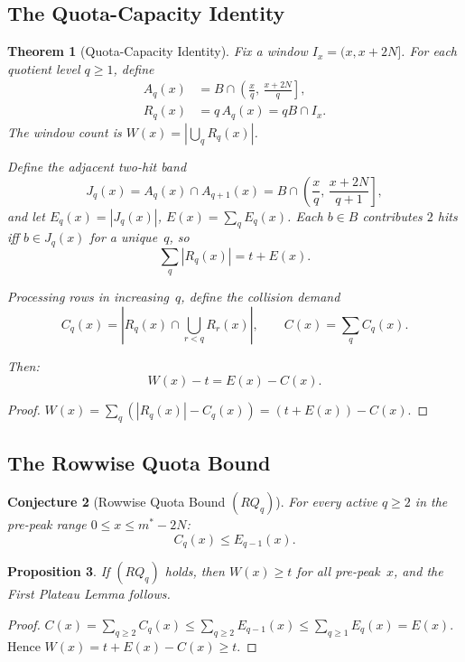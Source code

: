 \documentclass[11pt,a4paper]{article}
\newtheorem{theorem}{Theorem}[section]
\newtheorem{proposition}[theorem]{Proposition}
\newtheorem{conjecture}[theorem]{Conjecture}
\theoremstyle{definition}
\begin{document}
\subsection{The Quota-Capacity Identity}

\begin{theorem}[Quota-Capacity Identity]\label{thm:qci}
Fix a window $I_x = (x, x+2N]$. For each quotient level $q \geq 1$, 
define
\begin{align}
A_q(x) &= B \cap \left(\frac{x}{q},\, \frac{x+2N}{q}\right], \\
R_q(x) &= q\,A_q(x) = qB \cap I_x.
\end{align}
The window count is $W(x) = |\bigcup_q R_q(x)|$.

Define the adjacent two-hit band
\[
J_q(x) = A_q(x) \cap A_{q+1}(x) 
= B \cap \left(\frac{x}{q},\, \frac{x+2N}{q+1}\right],
\]
and let $E_q(x) = |J_q(x)|$, $E(x) = \sum_q E_q(x)$. Each $b \in B$ 
contributes $2$ hits iff $b \in J_q(x)$ for a unique~$q$, so
\[
\sum_q |R_q(x)| = t + E(x).
\]

Processing rows in increasing~$q$, define the collision demand
\[
C_q(x) = \left|R_q(x) \cap \bigcup_{r<q} R_r(x)\right|,
\qquad C(x) = \sum_q C_q(x).
\]

Then:
\[
\boxed{W(x) - t = E(x) - C(x).}
\]
\end{theorem}

\begin{proof}
$W(x) = \sum_q (|R_q(x)| - C_q(x)) = (t + E(x)) - C(x)$.
\end{proof}

\subsection{The Rowwise Quota Bound}

\begin{conjecture}[Rowwise Quota Bound $(RQ_q)$]\label{conj:rqq}
For every active $q \geq 2$ in the pre-peak range 
$0 \leq x \leq m^* - 2N$:
\[
C_q(x) \leq E_{q-1}(x).
\]
\end{conjecture}

\begin{proposition}
If $(RQ_q)$ holds, then $W(x) \geq t$ for all pre-peak~$x$, and the 
First Plateau Lemma follows.
\end{proposition}

\begin{proof}
$C(x) = \sum_{q \geq 2} C_q(x) \leq \sum_{q \geq 2} E_{q-1}(x) 
\leq \sum_{q \geq 1} E_q(x) = E(x)$. Hence 
$W(x) = t + E(x) - C(x) \geq t$.
\end{proof}
\end{document}
